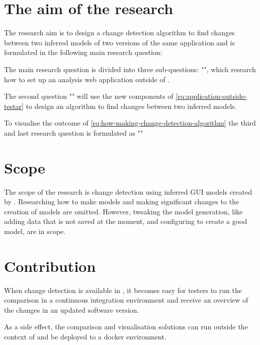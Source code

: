 \section{The aim of the research}
The research aim is to design a change detection algorithm to find changes between two inferred models of two versions of the same application and is formulated in the following main research question:

\textbf{\rqMainQuestion}

The main research question is divided into three sub-questions: "\textit{\rqApplicationOutsideTestar}", which research how to set up an analysis web application outside of \testar. 

The second question "\textit{\rqHowMakingChangeDetectionAlgorithm}" will use the new components of \ref{rq:application-outside-testar} to design an algorithm to find changes between two inferred models. 

To visualise the outcome of \ref{rq:how-making-change-detection-algorithm} the third and last research question is formulated as "\textit{\rqHowToVisualiseResult}"

\section{Scope}
The scope of the research is change detection using inferred GUI models created by \testar. Researching how to make models and making significant changes to the creation of models are omitted. However, tweaking the model generation, like adding data that is not saved at the moment, and configuring \testar to create a good model, are in scope.

\section{Contribution}
When change detection is available in \testar, it becomes easy for testers to run the comparison in a continuous integration environment and receive an overview of the changes in an updated software version.

As a side effect, the comparison and visualisation solutions can run outside the context of \testar and be deployed to a docker environment.

